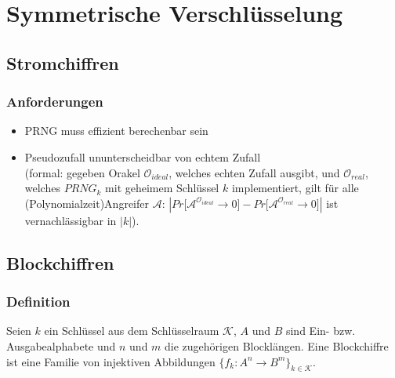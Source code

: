 \documentclass[a4paper,twoside,DIV15,BCOR12mm]{scrbook}
\begin{document}
	
\chapter{Symmetrische Verschlüsselung}


\section{Stromchiffren}

\begin{figure}[htb]

\end{figure}

\subsection{Anforderungen}
	\begin{itemize}
		\item PRNG muss effizient berechenbar sein
		\item Pseudozufall ununterscheidbar von echtem Zufall\\ (formal: gegeben Orakel $\mathcal{O}_{ideal}$, welches echten Zufall ausgibt, und $\mathcal{O}_{real}$, welches ${PRNG}_k$ mit geheimem Schlüssel $k$ implementiert, gilt für alle (Polynomialzeit)Angreifer $\mathcal{A}$: $\left| Pr\lbrack \mathcal{A}^{\mathcal{O}_{ideal}} \rightarrow 0 \rbrack - Pr\lbrack \mathcal{A}^{\mathcal{O}_{real}} \rightarrow 0 \rbrack \right|$ ist vernachlässigbar in $\left| k \right|$).
	\end{itemize}
	
\section{Blockchiffren}

\subsection{Definition}

Seien $k$ ein Schlüssel aus dem Schlüsselraum $\mathcal{K}$, $A$ und $B$ sind Ein- bzw. Ausgabealphabete und $n$ und $m$ die zugehörigen Blocklängen. Eine Blockchiffre ist eine Familie von injektiven Abbildungen $\{ f_k \colon A^n \rightarrow B^m \}_{k \in \mathcal{K}}$. \\
\end{document}
